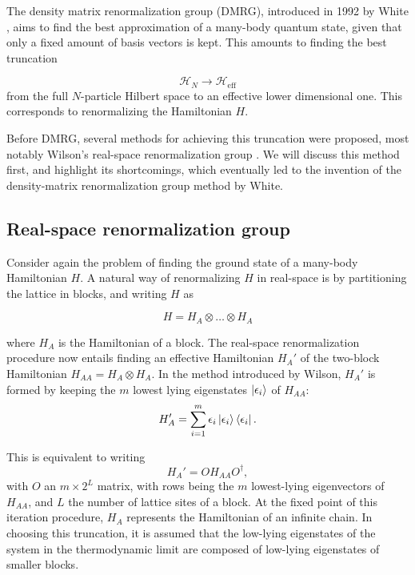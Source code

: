The density matrix renormalization group (DMRG), introduced in 1992 by
White \cite{white1992density}, aims to find the best approximation of
a many-body quantum state, given that only a fixed amount of basis vectors
is kept. This amounts to finding the best truncation

\begin{equation}
  \mathcal{H}_N \rightarrow \mathcal{H}_{\text{eff}}
\end{equation}
from the full $N$-particle Hilbert space to an effective lower dimensional
one. This corresponds to renormalizing the Hamiltonian $H$.

Before DMRG, several methods for achieving this truncation were proposed, most notably
Wilson's real-space renormalization group \cite{wilson1975renormalization}. We will
discuss this method first, and highlight its shortcomings, which eventually led to the
invention of the density-matrix renormalization group method by White.

\subsection{Real-space renormalization group}

Consider again the problem of finding the ground state of a many-body
Hamiltonian $H$. A natural way of renormalizing $H$ in real-space is by
partitioning the lattice in blocks, and writing $H$ as

\begin{equation}
  H = H_A \otimes \ldots \otimes H_A
\end{equation}

where $H_A$ is the Hamiltonian of a block.  The real-space
renormalization procedure now entails finding an effective Hamiltonian $H_{A}'$ of the
two-block Hamiltonian $H_{AA} = H_A \otimes H_A$. In the method introduced
by Wilson, $H_{A}'$ is formed by keeping the $m$ lowest lying eigenstates
$\ket{\epsilon_{i}}$ of $H_{AA}$:
\begin{equation}
  H_{A}' = \sum_{i = 1}^{m} \epsilon_{i} \ket{\epsilon_{i}}\bra{\epsilon_{i}}.
 \end{equation}

This is equivalent to writing
\begin{equation}
  H_{A}' = O H_{AA} O^{\dagger},
\end{equation}
with $O$ an $m \times 2^L$ matrix, with rows being the $m$ lowest-lying
eigenvectors of $H_{AA}$, and $L$ the number of lattice sites of a block. At
the fixed point of this iteration procedure, $H_A$ represents the
Hamiltonian of an infinite chain.
In choosing this truncation, it is assumed that the
low-lying eigenstates of the system in the thermodynamic limit are
composed of low-lying eigenstates of smaller blocks.

